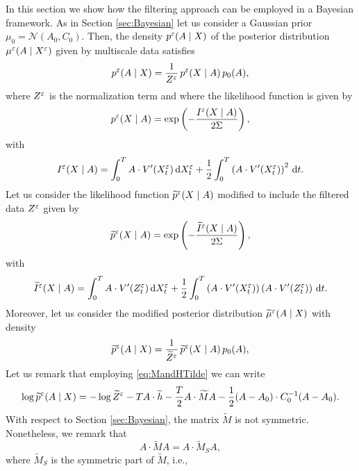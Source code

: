 \documentclass[10pt]{article}
\begin{document}
In this section we show how the filtering approach can be employed in a Bayesian framework. As in Section \ref{sec:Bayesian} let us consider a Gaussian prior $\mu_0 = \mathcal N(A_0, C_0)$. Then, the density $p^\varepsilon(A \mid X)$ of the posterior distribution $\mu^\varepsilon(A \mid X^\varepsilon)$ given by multiscale data satisfies
\begin{equation}
	p^\varepsilon(A \mid X) = \frac1{Z^\varepsilon} \, p^\varepsilon(X \mid A) \, p_0(A),
\end{equation}
where $Z^\varepsilon$ is the normalization term and where the likelihood function is given by
\begin{equation}
	p^\varepsilon(X \mid A) = \exp\left(-\frac{I^\varepsilon(X\mid A)}{2\Sigma} \right), 
\end{equation}
with
\begin{equation}
	I^\varepsilon(X\mid A) = \int_0^T A \cdot V'(X_t^\varepsilon) \,\mathrm{d} X_t^\varepsilon + \frac12 \int_0^T \left( A \cdot V'(X_t^\varepsilon) \right)^2 \,\mathrm{d} t.
\end{equation}
Let us consider the likelihood function $\widetilde p^\varepsilon(X \mid A)$ modified to include the filtered data $Z^\varepsilon$ given by
\begin{equation}
	\widetilde p^\varepsilon(X \mid A) = \exp\left(-\frac{\widetilde I^\varepsilon(X\mid A)}{2\Sigma} \right), 
\end{equation}
with
\begin{equation}
	\widetilde I^\varepsilon(X\mid A) = \int_0^T A \cdot V'(Z_t^\varepsilon) \,\mathrm{d} X_t^\varepsilon + \frac12 \int_0^T \left( A \cdot V'(X_t^\varepsilon) \right) \left( A \cdot V'(Z_t^\varepsilon) \right) \,\mathrm{d} t.
\end{equation}
Moreover, let us consider the modified posterior distribution $\widetilde \mu^\varepsilon(A \mid X)$ with density
\begin{equation}
	\widetilde p^\varepsilon(A \mid X) = \frac1{\widetilde Z^\varepsilon} \, \widetilde p^\varepsilon(X \mid A) \, p_0(A),
\end{equation}
Let us remark that employing \eqref{eq:MandHTilde} we can write 
\begin{equation}
	\log \widetilde p^\varepsilon(A \mid X) = -\log \widetilde Z^\varepsilon - T A \cdot \widetilde h - \frac{T}{2} A \cdot \widetilde M A - \frac12 (A - A_0) \cdot C_0^{-1}(A-A_0).
\end{equation}
With respect to Section \ref{sec:Bayesian}, the matrix $\widetilde M$ is not symmetric. Nonetheless, we remark that
\begin{equation}
	A \cdot \widetilde M A = A \cdot \widetilde M_S A,
\end{equation}
where $\widetilde M_S$ is the symmetric part of $\widetilde M$, i.e.,
\end{document}
